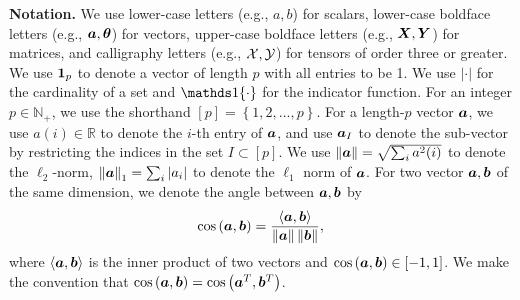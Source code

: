 \documentclass[lettersize,onecolumn,journal]{IEEEtran}
\theoremstyle{definition}
\theoremstyle{definition}
\newcommand{\of}[1]{\left(#1\right)}
\newcommand{\offf}[1]{\left\{#1\right\}}
\newcommand{\ang}[1]{\left\langle#1\right\rangle}
\begin{document}
\begin{table}[t]
    \caption{Comparison between previous methods with our method. $^*$We list the result for order-K tensors with $K \geq 3$ and general number of communities $r = \tO(1)$. }\label{tab:comp}
\end{table}

{\bf Notation.} We use lower-case letters (e.g., $a,b$) for scalars, lower-case boldface letters (e.g., $\bm{a},\boldsymbol{\theta}$) for vectors, upper-case boldface letters (e.g., $\bm X,\bm Y$) for matrices, and calligraphy letters (e.g., $\mathcal{X},\mathcal{Y}$) for tensors of order three or greater. We use $\mathbf{1}_p$ to denote a vector of length $p$ with all entries to be 1. We use $|\cdot|$ for the cardinality of a set and $\ind\{\cdot\}$ for the indicator function. For an integer $p\in\mathbb{N}_{+}$, we use the shorthand $[p]= \offf{1,2,...,p}$. For a length-$p$ vector $\bm{a}$, we use $a(i)\in\mathbb{R}$ to denote the $i$-th entry of $\bm{a}$, and use $\bm{a}_{I}$ to denote the sub-vector by restricting the indices in the set $I\subset [p]$.  We use  $\left\lVert\bm{a}\right\rVert=\sqrt{\sum_{i}a^2(i)}$ to denote the $\ell_2$-norm, $\left\lVert\bm{a}\right\rVert_1=\sum_i |a_i|$ to denote the $\ell_1$ norm of $\bm{a}$. For two vector $\bm{a}, \bm{b}$ of the same dimension, we denote the angle between $\bm{a}, \bm{b}$ by 
\begin{equation}
    \cos \of{\ma, \mb} = \frac{\ang{ \ma, \mb}}{ \onorm{\ma} \onorm{\mb} },
\end{equation}
where $\ang{\ma,\mb}$ is the inner product of two vectors and $\cos \of{\ma, \mb} \in [-1,1]$. We make the convention that $\cos \of{\ma, \mb} = \cos \of{\ma^T, \mb^T}$. 
\end{document}
